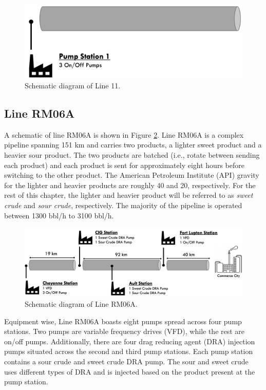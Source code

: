 \begin{figure}[h]
    \centering
    \includegraphics[scale=0.45]{images/08Line11.png}
    \caption{Schematic diagram of Line 11.}
    \label{fig:08Line11}
\end{figure}


\subsection{Line RM06A}
A schematic of line RM06A is shown in Figure \ref{fig:08RM06A}.  Line RM06A is a complex pipeline spanning 151 km and carries two products, a lighter sweet product and a heavier sour product. The two products are batched (i.e., rotate between sending each product) and each product is sent for approximately eight hours before switching to the other product. The American Petroleum Institute (API) gravity for the lighter and heavier products are roughly 40 and 20, respectively. For the rest of this chapter, the lighter and heavier product will be referred to as \textit{sweet crude} and \textit{sour crude}, respectively. The majority of the pipeline is operated between 1300 bbl/h to 3100 bbl/h. 

\begin{figure}[h]
    \centering
    \includegraphics[scale=0.35]{images/08RM06A.png}
    \caption{Schematic diagram of Line RM06A.}
    \label{fig:08RM06A}
\end{figure}

Equipment wise, Line RM06A boasts eight pumps spread across four pump stations. Two pumps are variable frequency drives (VFD), while the rest are on/off pumps. Additionally, there are four drag reducing agent (DRA) injection pumps situated across the second and third pump stations. Each pump station contains a sour crude and sweet crude DRA pump. The sour and sweet crude uses different types of DRA and is injected based on the product present at the pump station. 



